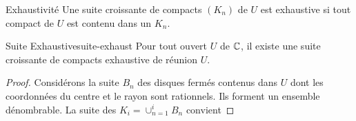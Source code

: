 \documentclass{cours}
\begin{document}
\begin{définition}{Exhaustivité}{}
	Une suite croissante de compacts $\left(K_{n}\right)$ de $U$ est exhaustive si tout compact de $U$ est contenu dans un $K_{n}$. 
\end{définition}

\begin{théorème}{Suite Exhaustive}{suite-exhaust}
	Pour tout ouvert $U$ de $\mathbb{C}$, il existe une suite croissante de compacts exhaustive de réunion $U$. 	
\end{théorème}
\begin{proof}
Considérons la suite $B_{n}$ des disques fermés contenus dans $U$ dont les coordonnées du centre et le rayon sont rationnels. Ils forment un ensemble dénombrable. La suite des $K_{i} = \cup_{n = 1}^{i} B_{n}$ convient
\end{proof}
\end{document}
